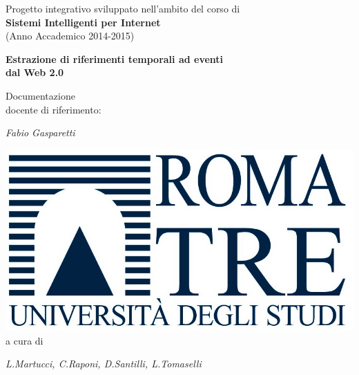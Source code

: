 \documentclass[a4paper]{report}
\begin{document}
\begin{titlepage}
\centering
Progetto integrativo sviluppato nell'ambito del corso di \\
\vspace{0.2cm}
{\LARGE \bf{Sistemi Intelligenti per Internet}}\\
\vspace{0.2cm}
(Anno Accademico 2014-2015) \\
\vspace{2.5cm}
\centering
{\Huge\bf Estrazione di riferimenti temporali ad eventi \\ dal Web 2.0\par}
\vspace{0.2cm}
Documentazione\\
\vspace{6cm}
docente di riferimento: \\
{\Large \em Fabio Gasparetti\par}
\vspace{1cm}
\includegraphics[scale=0.5]{logoRomaTre.jpg}\\
\vspace{1cm}
a cura di\\
{\Large \em L.Martucci, C.Raponi, D.Santilli, L.Tomaselli\par}
\vspace{0.4cm}
\date{\currenttime}
\end{titlepage}

\tableofcontents
\end{document}
